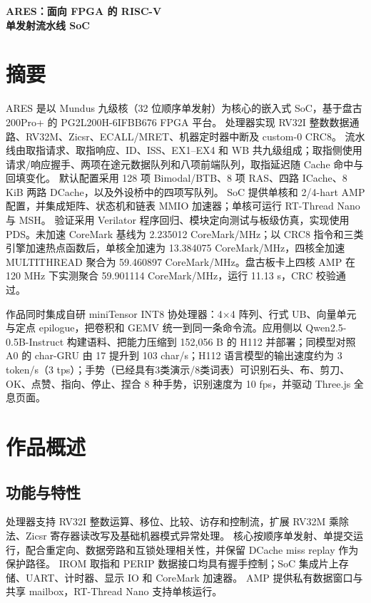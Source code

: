 \documentclass[UTF8,a4paper,12pt,fontset=none,scheme=plain]{ctexart}
\begin{document}
\begin{center}
{\songti\bfseries{} ARES：面向 FPGA 的 RISC-V\\单发射流水线 SoC\par}
\end{center}
\vspace{8pt}
\section*{摘要}
ARES 是以 Mundus 九级核（32 位顺序单发射）为核心的嵌入式 SoC，基于盘古 200Pro+ 的 PG2L200H-6IFBB676 FPGA 平台。
处理器实现 RV32I 整数数据通路、RV32M、Zicsr、ECALL/MRET、机器定时器中断及 custom-0 CRC8。
流水线由取指请求、取指响应、ID、ISS、EX1--EX4 和 WB 共九级组成；取指侧使用请求/响应握手、两项在途元数据队列和八项前端队列，取指延迟随 Cache 命中与回填变化。
默认配置采用 128 项 Bimodal/BTB、8 项 RAS、四路 ICache、8 KiB 两路 DCache，以及外设桥中的四项写队列。
SoC 提供单核和 2/4-hart AMP 配置，并集成矩阵、状态机和链表 MMIO 加速器；单核可运行 RT-Thread Nano 与 MSH。
验证采用 Verilator 程序回归、模块定向测试与板级仿真，实现使用 PDS。未加速 CoreMark 基线为 2.235012 CoreMark/MHz；以 CRC8 指令和三类引擎加速热点函数后，单核全加速为 13.384075 CoreMark/MHz，四核全加速 MULTITHREAD 聚合为 59.460897 CoreMark/MHz。盘古板卡上四核 AMP 在 120 MHz 下实测聚合 59.901114 CoreMark/MHz，运行 11.13 s，CRC 校验通过。

作品同时集成自研 miniTensor INT8 协处理器：4×4 阵列、行式 UB、向量单元与定点 \mbox{epilogue}，把卷积和 GEMV 统一到同一条命令流。应用侧以 Qwen2.5-0.5B-Instruct 构建语料、把能力压缩到 152,056 B 的 H112 并部署；同模型对照 A0 的 char-GRU 由 17 提升到 103 char/s；H112 语言模型的输出速度约为 3 token/s（3 tps）；手势（已经具有3类演示/8类词表）可识别石头、布、剪刀、OK、点赞、指向、停止、捏合 8 种手势，识别速度为 10 fps，并驱动 Three.js 全息页面。


\clearpage
{\tableofcontents}
\clearpage

\section{作品概述}
\subsection{功能与特性}
处理器支持 RV32I 整数运算、移位、比较、访存和控制流，扩展 RV32M 乘除法、Zicsr 寄存器读改写及基础机器模式异常处理。
核心按顺序单发射、单提交运行，配合重定向、数据旁路和互锁处理相关性，并保留 DCache miss replay 作为保护路径。
IROM 取指和 PERIP 数据接口均具有握手控制；SoC 集成片上存储、UART、计时器、显示 IO 和 CoreMark 加速器。
AMP 提供私有数据窗口与共享 mailbox，RT-Thread Nano 支持单核运行。
\end{document}
